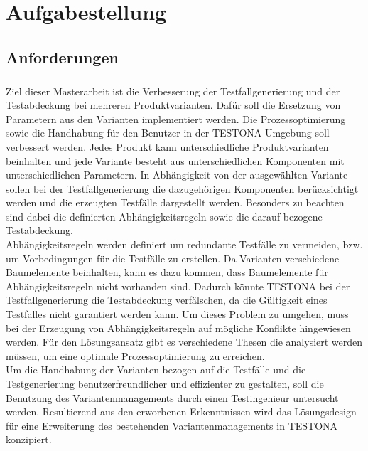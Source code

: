 
\chapter{Aufgabestellung}\label{chp:aufgabenstellung}

\section{Anforderungen}
\paragraph{}
Ziel dieser Masterarbeit ist die Verbesserung der Testfallgenerierung und der Testabdeckung bei mehreren Produktvarianten. Dafür soll die Ersetzung von Parametern aus den Varianten implementiert werden. Die Prozessoptimierung sowie die Handhabung für den Benutzer in der TESTONA-Umgebung soll verbessert werden. Jedes Produkt kann unterschiedliche Produktvarianten beinhalten und jede Variante besteht aus unterschiedlichen Komponenten mit unterschiedlichen Parametern. In Abhängigkeit von der ausgewählten Variante sollen bei der Testfallgenerierung die dazugehörigen Komponenten berücksichtigt werden und die erzeugten Testfälle dargestellt werden. Besonders zu beachten sind dabei die definierten Abhängigkeitsregeln sowie die darauf bezogene Testabdeckung.\\

Abhängigkeitsregeln werden definiert um redundante Testfälle zu vermeiden, bzw. um Vorbedingungen für die Testfälle zu erstellen. Da Varianten verschiedene Baumelemente beinhalten, kann es dazu kommen, dass Baumelemente für Abhängigkeitsregeln nicht vorhanden sind. Dadurch könnte TESTONA bei der Testfallgenerierung die Testabdeckung verfälschen, da die Gültigkeit eines Testfalles nicht garantiert werden kann. Um dieses Problem zu umgehen, muss bei der Erzeugung von Abhängigkeitsregeln auf mögliche Konflikte hingewiesen werden. Für den Lösungsansatz gibt es verschiedene Thesen die analysiert werden müssen, um eine optimale Prozessoptimierung zu erreichen.\\

Um die Handhabung der Varianten bezogen auf die Testfälle und die Testgenerierung benutzerfreundlicher und effizienter zu gestalten, soll die Benutzung des Variantenmanagements durch einen Testingenieur untersucht werden. Resultierend aus den erworbenen Erkenntnissen wird das Lösungsdesign für eine Erweiterung des bestehenden Variantenmanagements in TESTONA konzipiert.\\


